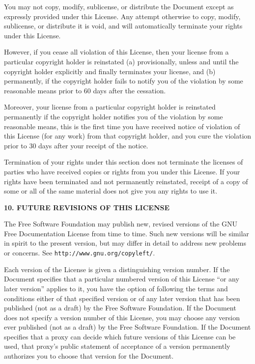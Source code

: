 \documentclass[onecolumn,a4paper]{article}
\numberwithin{equation}{section}
\begin{document}
You may not copy, modify, sublicense, or distribute the Document
except as expressly provided under this License.  Any attempt
otherwise to copy, modify, sublicense, or distribute it is void, and
will automatically terminate your rights under this License.

However, if you cease all violation of this License, then your license
from a particular copyright holder is reinstated (a) provisionally,
unless and until the copyright holder explicitly and finally
terminates your license, and (b) permanently, if the copyright holder
fails to notify you of the violation by some reasonable means prior to
60 days after the cessation.

Moreover, your license from a particular copyright holder is
reinstated permanently if the copyright holder notifies you of the
violation by some reasonable means, this is the first time you have
received notice of violation of this License (for any work) from that
copyright holder, and you cure the violation prior to 30 days after
your receipt of the notice.

Termination of your rights under this section does not terminate the
licenses of parties who have received copies or rights from you under
this License.  If your rights have been terminated and not permanently
reinstated, receipt of a copy of some or all of the same material does
not give you any rights to use it.


\begin{center}
{\Large\bf 10. FUTURE REVISIONS OF THIS LICENSE\par}
\end{center}


The Free Software Foundation may publish new, revised versions
of the GNU Free Documentation License from time to time.  Such new
versions will be similar in spirit to the present version, but may
differ in detail to address new problems or concerns.  See
\texttt{http://www.gnu.org/copyleft/}.

Each version of the License is given a distinguishing version number.
If the Document specifies that a particular numbered version of this
License ``or any later version'' applies to it, you have the option of
following the terms and conditions either of that specified version or
of any later version that has been published (not as a draft) by the
Free Software Foundation.  If the Document does not specify a version
number of this License, you may choose any version ever published (not
as a draft) by the Free Software Foundation.  If the Document
specifies that a proxy can decide which future versions of this
License can be used, that proxy's public statement of acceptance of a
version permanently authorizes you to choose that version for the
Document.
\end{document}
